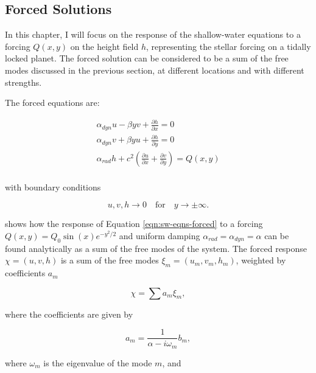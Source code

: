 \subsection{Forced Solutions}

In this chapter, I will focus on the response of the shallow-water equations to a forcing $Q(x,y)$ on the height field $h$, representing the stellar forcing on a tidally locked planet. The forced solution can be considered to be a sum of the free modes discussed in the previous section, at different locations and with different strengths.

The forced equations are:

\begin{equation}\label{eqn:sw-eqns-forced}
  \begin{gathered}
    \alpha_{dyn} u - \beta y v +\frac{\partial h}{\partial x} = 0 \\
    \alpha_{dyn} v + \beta y u + \frac{\partial h}{\partial y} = 0 \\
    \alpha_{rad} h + c^{2}(\frac{\partial u}{\partial x} + \frac{\partial v}{\partial y}) = Q(x,y) \\
  \end{gathered}
\end{equation}

with boundary conditions

\begin{equation}
  u , v , h \rightarrow 0 \quad \mathrm{for} \quad y \rightarrow \pm \infty.
\end{equation}

\citet{matsuno1966quasi} shows how the response of Equation \ref{eqn:sw-eqns-forced} to a forcing $Q(x,y) = Q_{0} \sin(x) e^{-y^{2}/2}$ and uniform damping $\alpha_{rad}=\alpha_{dyn}=\alpha$ can be found analytically as a sum of the free modes of the system. The forced response $\chi = (u,v,h)$ is a sum of the free modes $\xi_{m}=(u_{m},v_{m},h_{m})$, weighted by coefficients $a_{m}$

\begin{equation}
  \chi = \sum a _ { m } \xi _ { m },
\end{equation}

where the coefficients are given by

\begin{equation}
  a _ { m } = \frac { 1 } { \alpha - i \omega _ { m } } b _ { m },
\end{equation}

where $\omega_{m}$ is the eigenvalue of the mode $m$, and

